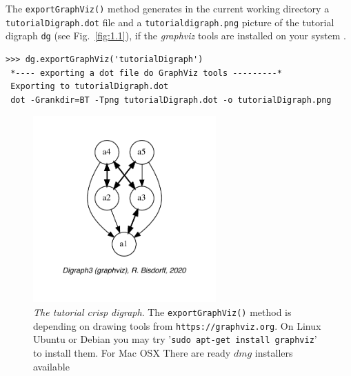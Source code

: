 The \texttt{exportGraphViz()} method generates in the current working directory a \texttt{tutorialDigraph.dot} file and a \texttt{tutorialdigraph.png} picture of the tutorial digraph \texttt{dg} (see Fig.~\vref{fig:1.1}), if the \emph{graphviz} tools are installed on your system \citep{graphviz}.
\begin{lstlisting}
>>> dg.exportGraphViz('tutorialDigraph')
 *---- exporting a dot file do GraphViz tools ---------*
 Exporting to tutorialDigraph.dot
 dot -Grankdir=BT -Tpng tutorialDigraph.dot -o tutorialDigraph.png
\end{lstlisting}
\begin{figure}[ht]
\sidecaption[t]
\includegraphics[width=7cm]{Figures/1-1-tutorialDigraph.pdf}
\caption[The tutorial crisp digraph]{\emph{The tutorial crisp digraph}. The \texttt{exportGraphViz()} method is depending on drawing tools from \texttt{https://graphviz.org}. On Linux Ubuntu or Debian you may try '\texttt{sudo apt-get install graphviz}’ to install them. For Mac OSX There are ready $dmg$ installers available}
\label{fig:1.1}       %
\end{figure}

